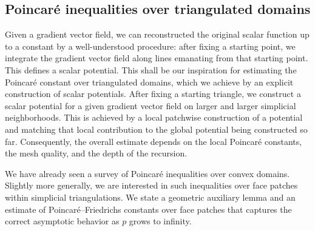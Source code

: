 \documentclass[a4paper]{amsart}
\begin{document}







\subsection{Poincar\'e inequalities over triangulated domains}

Given a gradient vector field, we can reconstructed the original scalar function up to a constant by a well-understood procedure: after fixing a starting point, we integrate the gradient vector field along lines emanating from that starting point. This defines a scalar potential. 
This shall be our inspiration for estimating the Poincar\'e constant over triangulated domains, which we achieve by an explicit construction of scalar potentials. 
After fixing a starting triangle, we construct a scalar potential for a given gradient vector field on larger and larger simplicial neighborhoods. This is achieved by a local patchwise construction of a potential and matching that local contribution to the global potential being constructed so far. 
Consequently, the overall estimate depends on the local Poincar\'e constants, the mesh quality, and the depth of the recursion. 


We have already seen a survey of Poincar\'e inequalities over convex domains. 
Slightly more generally, we are interested in such inequalities over face patches within simplicial triangulations. 
We state a geometric auxiliary lemma and an estimate of Poincar\'e--Friedrichs constants over face patches 
that captures the correct asymptotic behavior as $p$ grows to infinity.
\end{document}
